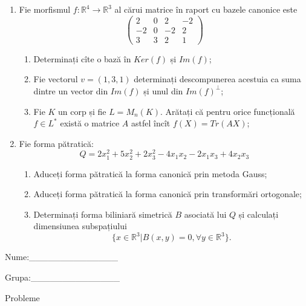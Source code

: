 \documentclass{article}
\begin{document}
\begin{enumerate}
 \item Fie morfismul $f:\mathbb{R}^4 \to \mathbb{R}^3$ al cărui matrice în raport cu bazele canonice este
$$\begin{pmatrix}
2&0&2&-2\\
-2&0&-2&2\\
3&3&2&1
\end{pmatrix}$$

\begin{enumerate}
\item Determinați cîte o bază în $Ker(f)$ și $Im(f)$;
\item Fie vectorul $v=(1,3,1)$ determinați descompunerea acestuia ca suma dintre un vector din $Im(f)$ și unul din $Im(f)^\perp$;
\item Fie $K$ un corp și fie $L=M_n(K)$. Arătați că pentru orice funcțională $f \in L^*$ există o matrice $A$ astfel încît $f(X)=Tr(AX)$;
\end{enumerate}
\item Fie forma pătratică:
$$Q= 2x_1^2+5x_2^2+2x_3^2-4x_1x_2-2x_1x_3+4x_2x_3$$

\begin{enumerate}
\item Aduceți forma pătratică la forma canonică prin metoda Gauss;
\item Aduceți forma pătratică la forma canonică prin transformări ortogonale;
\item Determinați forma biliniară simetrică $B$ asociată lui $Q$ și calculați dimensiunea subspațiului
$$\{x \in \mathbb{R}^3 | B(x,y)=0,\forall y \in \mathbb{R}^3\}.$$

\end{enumerate}
\end{enumerate}
\newpage
\begin{flushright}
Nume:\_\_\_\_\_\_\_\_\_\_\_\_\_\_
 
 
Grupa:\_\_\_\_\_\_\_\_\_\_\_\_\_\_
\end{flushright}
\begin{center}
\vspace{2cm}
{\Large Probleme}
\vspace{2cm}
\end{center}
\end{document}
